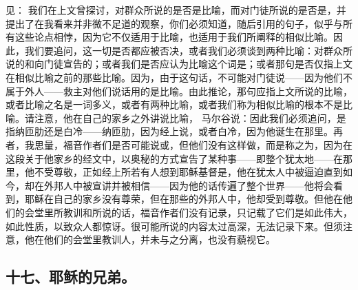  见： 我们在上文曾探讨，对群众所说的是否是比喻，而对门徒所说的是否是，并提出了在我看来并非微不足道的观察，你们必须知道，随后引用的句子，似乎与所有这些论点相悖，因为它不仅适用于比喻，也适用于我们所阐释的相似比喻。因此，我们要追问，这一切是否都应被否决，或者我们必须谈到两种比喻：对群众所说的和向门徒宣告的；或者我们是否应认为比喻这个词是；或者那句是否仅指上文在相似比喻之前的那些比喻。因为，由于这句话，不可能对门徒说——因为他们不属于外人——救主对他们说话用的是比喻。由此推论，那句应指上文所说的比喻，或者比喻之名是一词多义，或者有两种比喻，或者我们称为相似比喻的根本不是比喻。请注意，他在自己的家乡之外讲说比喻， 马尔谷说：因此我们必须追问，是指纳匝肋还是白冷——纳匝肋，因为经上说，或者白冷，因为他诞生在那里。再者，我思量，福音作者们是否可能说或，但他们没有这样做，而是称之为，因为在这段关于他家乡的经文中，以奥秘的方式宣告了某种事——即整个犹太地——在那里，他不受尊敬，正如经上所若有人想到耶稣基督是，他在犹太人中被逼迫直到如今，却在外邦人中被宣讲并被相信——因为他的话传遍了整个世界——他将会看到，耶稣在自己的家乡没有尊荣，但在那些的外邦人中，他却受到尊敬。但他在他们的会堂里所教训和所说的话，福音作者们没有记录，只记载了它们是如此伟大，如此性质，以致众人都惊讶。很可能所说的内容太过高深，无法记录下来。但须注意，他在他们的会堂里教训人，并未与之分离，也没有藐视它。\par


\subsection{十七、耶稣的兄弟。}

